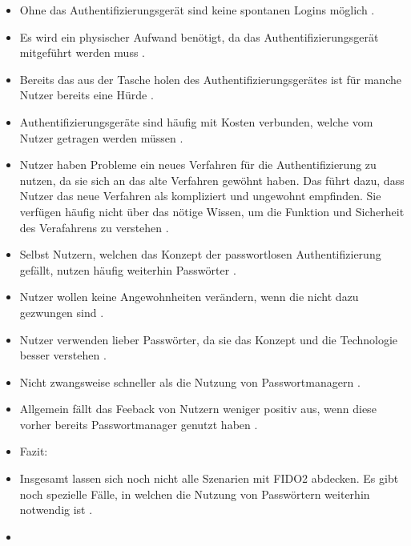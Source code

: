 \begin{itemize}
    \item Ohne das Authentifizierungsgerät sind keine spontanen Logins möglich \cite{lyastani2020fido2}.
    \item Es wird ein physischer Aufwand benötigt, da das Authentifizierungsgerät mitgeführt werden muss \cite{lyastani2020fido2}.
    \item Bereits das aus der Tasche holen des Authentifizierungsgerätes ist für manche Nutzer bereits eine Hürde \cite{farke2020you}.
    \item Authentifizierungsgeräte sind häufig mit Kosten verbunden, welche vom Nutzer getragen werden müssen \cite{lyastani2020fido2}.
    \item Nutzer haben Probleme ein neues Verfahren für die Authentifizierung zu nutzen, da sie sich an das alte Verfahren gewöhnt haben. Das führt dazu, dass Nutzer das neue Verfahren als kompliziert und ungewohnt empfinden. Sie verfügen häufig nicht über das nötige Wissen, um die Funktion und Sicherheit des Verafahrens zu verstehen \cite{lyastani2020fido2}.
    \item Selbst Nutzern, welchen das Konzept der passwortlosen Authentifizierung gefällt, nutzen häufig weiterhin Passwörter \cite{farke2020you}.
    \item Nutzer wollen keine Angewohnheiten verändern, wenn die nicht dazu gezwungen sind \cite{farke2020you}.
    \item Nutzer verwenden lieber Passwörter, da sie das Konzept und die Technologie besser verstehen \cite{lyastani2020fido2}.
    \item Nicht zwangsweise schneller als die Nutzung von Passwortmanagern \cite{farke2020you}.
    \item Allgemein fällt das Feeback von Nutzern weniger positiv aus, wenn diese vorher bereits Passwortmanager genutzt haben \cite{farke2020you}.
    \item Fazit:
    \item Insgesamt lassen sich noch nicht alle Szenarien mit FIDO2 abdecken. Es gibt noch spezielle Fälle, in welchen die Nutzung von Passwörtern weiterhin notwendig ist \cite{lyastani2020fido2}.
    \item 
\end{itemize}